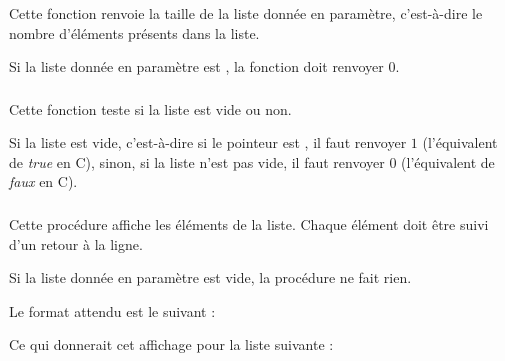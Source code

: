\noindent Cette fonction renvoie la taille de la liste donnée en paramètre, c'est-à-dire le nombre d'éléments présents dans la liste.

\smallskip

\noindent Si la liste donnée en paramètre est , la fonction doit renvoyer $ 0 $.

\bigskip


\subsubsection*{}

\noindent Cette fonction teste si la liste est vide ou non.

\smallskip

\noindent Si la liste est vide, c'est-à-dire si le pointeur est , il faut renvoyer $ 1 $ (l'équivalent de \textit{true} en C), sinon, si la liste n'est pas vide, il faut renvoyer $ 0 $ (l'équivalent de \textit{faux} en C).

\bigskip


\subsubsection*{}

\noindent Cette procédure affiche les éléments de la liste.
Chaque élément doit être suivi d'un retour à la ligne.

\smallskip

\noindent Si la liste donnée en paramètre est vide, la procédure ne fait rien.

\noindent Le format attendu est le suivant :

\bigskip

\noindent {}

\bigskip

\noindent Ce qui donnerait cet affichage pour la liste suivante :

